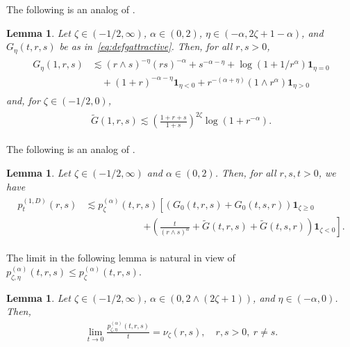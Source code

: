 \documentclass[12pt,reqno]{amsart}
\newtheorem{lemma}[theorem]{Lemma}
\theoremstyle{definition}
\theoremstyle{remark}
\numberwithin{equation}{section}
\newcommand{\1}{\mathbbm{1}}
\newcommand{\one}{\mathbf{1}}
\begin{document}
The following is an analog of \cite[Lemma~4.9]{Bogdanetal2024}.
\begin{lemma}
  \label{glogestimatesattractive}
  Let $\zeta\in(-1/2,\infty)$, $\alpha\in(0,2)$, $\eta\in(-\alpha,2\zeta+1-\alpha)$, and $G_\eta(t,r,s)$ be as in~\eqref{eq:defgattractive}. Then, for all $r,s>0$,
  \begin{align}
    \label{eq:glogestimatesattractive}
    \begin{split}
      G_\eta(1,r,s)
      & \lesssim (r\wedge s)^{-\eta}(rs)^{-\alpha} + s^{-\alpha-\eta} + \log(1+1/r^\alpha)\one_{\eta=0} \\
      & \quad + (1+r)^{-\alpha-\eta}\one_{\eta<0} + r^{-(\alpha+\eta)}(1\wedge r^\alpha)\one_{\eta>0}
    \end{split}
  \end{align}
  and, for $\zeta\in(-1/2,0)$,
  \begin{align}
    \label{eq:glogestimatesattractivenew}
    \begin{split}
      \tilde G(1,r,s) \lesssim \left(\frac{1+r+s}{1+s}\right)^{2\zeta}\log(1+r^{-\alpha}). 
    \end{split}
  \end{align}
\end{lemma}

The following is an analog of \cite[Lemma~4.19]{Bogdanetal2024}.
\begin{lemma}
  \label{jaklem37}
  Let $\zeta\in(-1/2,\infty)$ and $\alpha\in(0,2)$. Then, for all $r,s,t>0$, we have
  \begin{align}
    \label{eq:jaklem37}
    \begin{split}
      p_t^{(1,D)}(r,s)
      & \lesssim p_\zeta^{(\alpha)}(t,r,s) \left[ \left(G_0(t,r,s) + G_0(t,s,r)\right)\one_{\zeta\geq0} \right. \\ & \qquad\qquad\qquad \left. + \left( \frac{t}{(r\wedge s)^{\alpha}} + \tilde G(t,r,s)+\tilde G(t,s,r)\right)\one_{\zeta<0}\right].
    \end{split}
  \end{align}
\end{lemma}

The limit in the following lemma is natural in view of $p_{\zeta,\eta}^{(\alpha)}(t,r,s)\leq p_\zeta^{(\alpha)}(t,r,s)$.

\begin{lemma}
  \label{nuellrepulsive}
  Let $\zeta\in(-1/2,\infty)$, $\alpha\in(0,2\wedge(2\zeta+1))$, and $\eta\in(-\alpha,0)$. Then,
  \begin{align}
    \label{eq:nuellrepulsive}
    \lim_{t\to0}\frac{p_{\zeta,\eta}^{(\alpha)}(t,r,s)}{t}
    = \nu_\zeta(r,s),\quad r,s>0,\ r\neq s.
  \end{align}
\end{lemma}
\end{document}
